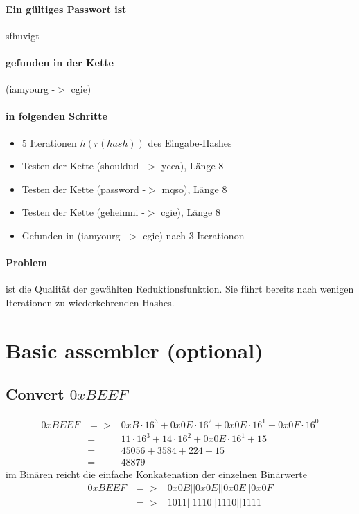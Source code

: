 \paragraph{Ein gültiges Passwort ist}
sfhuvigt

\paragraph{gefunden in der Kette}
(iamyourg -$>$ cgie)

\paragraph{in folgenden Schritte}
\begin{itemize}
\item 5 Iterationen $h(r(hash))$ des Eingabe-Hashes
\item Testen der Kette (shouldud -$>$ ycea), Länge 8
\item Testen der Kette (password -$>$ mqso), Länge 8
\item Testen der Kette (geheimni -$>$ cgie), Länge 8
\item Gefunden in (iamyourg -$>$ cgie) nach 3 Iterationon
\end{itemize}

\paragraph{Problem} ist die Qualität der gewählten Reduktionsfunktion. Sie führt
bereits nach wenigen Iterationen zu wiederkehrenden Hashes.


\section{Basic assembler (optional)}

\subsection*{Convert $0xBEEF$}
\begin{eqnarray}
    0xBEEF &=>& 0xB\cdot16^3 + 0x0E\cdot16^2 + 0x0E\cdot16^1 + 0x0F\cdot16^0 \\
           &=& 11\cdot16^3 + 14\cdot16^2 + 0x0E\cdot16^1 + 15 \\
           &=& 45056 + 3584 + 224 + 15 \\
           &=& 48879
\end{eqnarray}
im Binären reicht die einfache Konkatenation der einzelnen Binärwerte
\begin{eqnarray}
    0xBEEF &=>& 0x0B || 0x0E || 0x0E || 0x0F \\
           &=>& 1011 || 1110 || 1110 || 1111 \\
\end{eqnarray}

